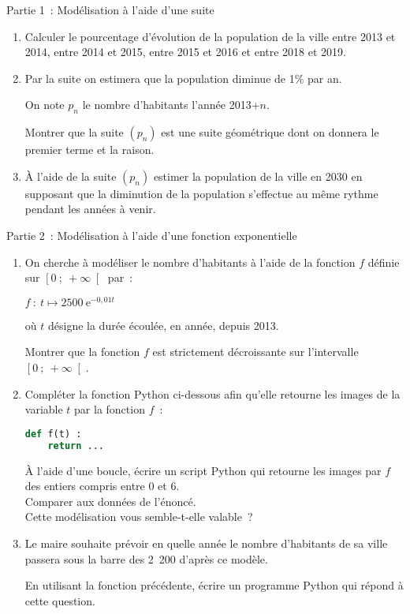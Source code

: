 \begin{h2} Partie 1~: Modélisation à l'aide d'une suite \end{h2}
\begin{enumerate}
     \item
     Calculer le pourcentage d'évolution de la population de la ville entre 2013 et 2014, entre 2014 et 2015, entre 2015 et 2016 et entre 2018 et 2019.
     \item
     Par la suite on estimera que la population diminue de 1\% par an.
     \par
     On note $ p_n $ le nombre d'habitants l'année 2013+$n$.
     \par
     Montrer que la suite $(p_n)$ est une suite géométrique dont on donnera le premier terme et la raison.
     \item
     À l'aide de la suite $ (p_n) $ estimer la population de la ville en 2030 en supposant que la diminution de la population s'effectue au même rythme pendant les années à venir.
\end{enumerate}
\begin{h2} Partie 2~: Modélisation à l'aide d'une fonction exponentielle\end{h2}
\begin{enumerate}
     \item
     On cherche à modéliser le nombre d'habitants à l'aide de la fonction $f$ définie sur $ \left[ 0~;~ +\infty \right[ $ par~:
     \begin{center}
          $f~: \ t \longmapsto 2500\ \text{e}^{ -0,01t } $
     \end{center}
     où $t$ désigne la durée écoulée, en année, depuis 2013.
     \par
     Montrer que la fonction $f$ est strictement décroissante sur l'intervalle $ \left[ 0~;~ +\infty \right[ $.
     \item
     Compléter la fonction Python ci-dessous afin qu'elle retourne les images de la variable $t$ par la fonction $f$~:
\begin{lstlisting}[language=Python]
def f(t) :
    return ...
\end{lstlisting}
À l'aide d'une boucle, écrire un script Python qui retourne les images par $f$ des entiers compris entre 0 et 6.
\\ Comparer aux données de l'énoncé.
\\ Cette modélisation vous semble-t-elle valable~?
\item
Le maire souhaite prévoir en quelle année le nombre d'habitants de sa ville passera sous la barre des 2~200 d'après ce modèle.
\par
En utilisant la fonction précédente, écrire un programme Python qui répond à cette question.
\end{enumerate}
